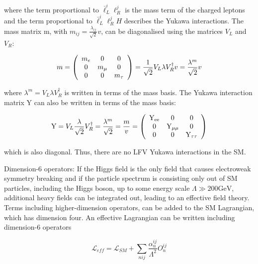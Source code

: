 where the term proportional to $\bar{\ell}_{L}^{i} \ell_{R}^{j}$ is the mass term of the charged leptons and the term proportional to $\bar{\ell}_{L}^{i} \ell_{R}^{j}H$ describes the Yukawa interactions. The mass matrix m, with $m_{ij}=\frac{\lambda_{ij}}{\sqrt{2}} v$, can be diagonalised using the matrices $V_{L}$ and $V_{R}$:

\begin{equation}
  m=\left(\begin{array}{ccc}
  m_{e} & 0 & 0 \\
  0 & m_{\mu} & 0 \\
  0 & 0 & m_{\tau}
  \end{array}\right)=\frac{1}{\sqrt{2}} V_{L} \lambda V_{R}^{\dagger} v=\frac{\lambda^{m}}{\sqrt{2}} v
\end{equation}

where $\lambda^{m}=V_{L} \lambda V_{R}^{\dagger}$ is written in terms of the mass basis. The Yukawa interaction matrix $\text{Y}$ can also be written in terms of the mass basis:

\begin{equation}
  \mathrm{Y}=V_{L} \frac{\lambda}{\sqrt{2}} V_{R}^{\dagger}=\frac{\lambda^{m}}{\sqrt{2}}=\frac{m}{v}=\left(\begin{array}{ccc}
  \text{Y}_{\text{e}\text{e}} & 0 & 0 \\
  0 & \text{Y}_{\mu\mu} & 0 \\
  0 & 0 & \text{Y}_{\tau\tau}
  \end{array}\right)
\end{equation}

which is also diagonal. Thus, there are no LFV Yukawa interactions in the SM.

Dimension-6 operators: If the Higgs field is the only field that causes electroweak symmetry breaking and if the particle spectrum is consisting only out of SM particles, including the Higgs boson, up to some energy scale $\Lambda \gg 200 \mathrm{GeV}$, additional heavy fields can be integrated out, leading to an effective field theory. Terms including higher-dimension operators, can be added to the SM Lagrangian, which has dimension four. An effective Lagrangian can be written including dimension-6 operators

\begin{equation}
  \mathcal{L}_{eff}=\mathcal{L}_{SM}+\sum_{nij} \frac{\alpha_{n}^{ij}}{\Lambda^2} O_{n}^{i j}
\end{equation}

